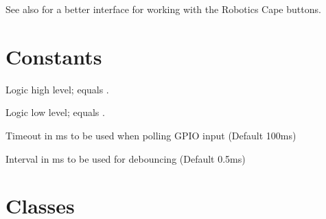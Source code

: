 \documentclass[letterpaper,10pt,english]{sphinxmanual}
\begin{document}
See also {\hyperref[\detokenize{index:rcpy.button.Button}]{}} for a better interface for
working with the Robotics Cape buttons.


\section{Constants}
\label{\detokenize{index:id1}}

\begin{fulllineitems}
\label{\detokenize{index:rcpy.gpio.HIGH}}
Logic high level; equals .

\end{fulllineitems}


\begin{fulllineitems}
\label{\detokenize{index:rcpy.gpio.LOW}}
Logic low level; equals .

\end{fulllineitems}


\begin{fulllineitems}
\label{\detokenize{index:rcpy.gpio.POLL_TIMEOUT}}
Timeout in ms to be used when polling GPIO input (Default 100ms)

\end{fulllineitems}


\begin{fulllineitems}
\label{\detokenize{index:rcpy.gpio.DEBOUNCE_INTERVAL}}
Interval in ms to be used for debouncing (Default 0.5ms)

\end{fulllineitems}



\section{Classes}
\label{\detokenize{index:classes}}
\end{document}
